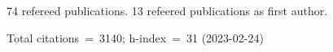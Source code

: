 74 refereed publications. 13 refeered publications as first author.

Total citations~=~3140; h-index~=~31 (2023-02-24)